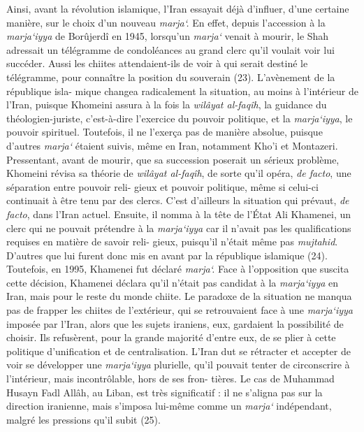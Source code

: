 Ainsi, avant la révolution islamique, l'Iran essayait déjà d'influer,
d'une certaine manière, sur le choix d'un nouveau \emph{marja`.} En
effet, depuis l'accession à la \emph{marja`iyya} de Borûjerdî en 1945,
lorsqu'un \emph{marja`} venait à mourir, le Shah adressait un télégramme
de condoléances au grand clerc qu'il voulait voir lui succéder. Aussi
les chiites attendaient-ils de voir à qui serait destiné le télégramme,
pour connaître la position du souverain (23). L'avènement de la
république isla- mique changea radicalement la situation, au moins à
l'intérieur de l'Iran, puisque Khomeini assura à la fois la
\emph{wilâyat al-faqîh}, la guidance du théologien-juriste, c'est-à-dire
l'exercice du pouvoir politique, et la \emph{marja`iyya}, le pouvoir
spirituel. Toutefois, il ne l'exerça pas de manière absolue, puisque
d'autres \emph{marja`} étaient suivis, même en Iran, notamment Kho'i et
Montazeri. Pressentant, avant de mourir, que sa succession poserait un
sérieux problème, Khomeini révisa sa théorie de \emph{wilâyat al-faqîh},
de sorte qu'il opéra, \emph{de facto}, une séparation entre pouvoir
reli- gieux et pouvoir politique, même si celui-ci continuait à être
tenu par des clercs. C'est d'ailleurs la situation qui prévaut, \emph{de
facto}, dans l'Iran actuel. Ensuite, il nomma à la tête de l'État Ali
Khamenei, un clerc qui ne pouvait prétendre à la \emph{marja`iyya} car
il n'avait pas les qualifications requises en matière de savoir reli-
gieux, puisqu'il n'était même pas \emph{mujtahid}. D'autres que lui
furent donc mis en avant par la république islamique (24). Toutefois, en
1995, Khamenei fut déclaré \emph{marja`.} Face à l'opposition que
suscita cette décision, Khamenei déclara qu'il n'était pas candidat à la
\emph{marja`iyya} en Iran, mais pour le reste du monde chiite. Le
paradoxe de la situation ne manqua pas de frapper les chiites de
l'extérieur, qui se retrouvaient face à une \emph{marja`iyya} imposée
par l'Iran, alors que les sujets iraniens, eux, gardaient la possibilité
de choisir. Ils refusèrent, pour la grande majorité d'entre eux, de se
plier à cette politique d'unification et de centralisation. L'Iran dut
se rétracter et accepter de voir se développer une \emph{marja`iyya}
plurielle, qu'il pouvait tenter de circonscrire à l'intérieur, mais
incontrôlable, hors de ses fron- tières. Le cas de Muhammad Husayn Fadl
Allâh, au Liban, est très significatif : il ne s'aligna pas sur la
direction iranienne, mais s'imposa lui-même comme un \emph{marja`}
indépendant, malgré les pressions qu'il subit (25).

